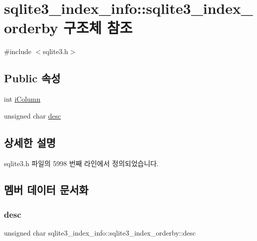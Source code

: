 \hypertarget{structsqlite3__index__info_1_1sqlite3__index__orderby}{}\section{sqlite3\+\_\+index\+\_\+info\+:\+:sqlite3\+\_\+index\+\_\+orderby 구조체 참조}
\label{structsqlite3__index__info_1_1sqlite3__index__orderby}


{\ttfamily \#include $<$sqlite3.\+h$>$}

\subsection*{Public 속성}
\begin{DoxyCompactItemize}
\item 
int \hyperlink{structsqlite3__index__info_1_1sqlite3__index__orderby_a266396085bfda9acef3f13eaa170cd2f}{i\+Column}
\item 
unsigned char \hyperlink{structsqlite3__index__info_1_1sqlite3__index__orderby_a0586d1b5d36221af96aeba8cfc56e9c6}{desc}
\end{DoxyCompactItemize}


\subsection{상세한 설명}


sqlite3.\+h 파일의 5998 번째 라인에서 정의되었습니다.



\subsection{멤버 데이터 문서화}
\mbox{\label{structsqlite3__index__info_1_1sqlite3__index__orderby_a0586d1b5d36221af96aeba8cfc56e9c6}} 
\subsubsection{\texorpdfstring{desc}{desc}}
{\footnotesize\ttfamily unsigned char sqlite3\+\_\+index\+\_\+info\+::sqlite3\+\_\+index\+\_\+orderby\+::desc}



